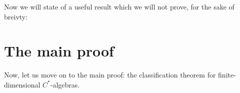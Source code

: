 \documentclass[aps,pra,showpacs,notitlepage,onecolumn,superscriptaddress,nofootinbib]{revtex4-1}
\theoremstyle{definition}
\begin{document}
\noindent Now we will state of a useful result which we will not prove, for the sake of breivty:



\section{The main proof}

\noindent Now, let us move on to the main proof: the classification theorem for finite-dimensional $C^{*}$-algebras.
\end{document}
